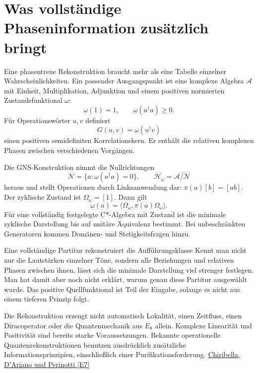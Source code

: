 \section{Was vollständige Phaseninformation zusätzlich bringt}
Eine phasentreue Rekonstruktion braucht mehr als eine Tabelle einzelner Wahrscheinlichkeiten. Ein passender Ausgangspunkt ist eine komplexe Algebra $\mathcal A$ mit Einheit, Multiplikation, Adjunktion und einem positiven normierten Zustandsfunktional $\omega$:
\begin{equation}
\omega(1)=1,\qquad\omega(a^\dagger a)\ge0.
\end{equation}
Für Operationswörter $u,v$ definiert
\begin{equation}
G(u,v)=\omega(u^\dagger v)
\end{equation}
einen positiven semidefiniten Korrelationskern. Er enthält die relativen komplexen Phasen zwischen verschiedenen Vorgängen.

Die GNS-Konstruktion nimmt die Nullrichtungen
\begin{equation}
\mathcal N=\{a:\omega(a^\dagger a)=0\},\qquad
\mathcal H_\omega=\overline{\mathcal A/\mathcal N}
\end{equation}
heraus und stellt Operationen durch Linksanwendung dar: $\pi(a)[b]=[ab]$. Der zyklische Zustand ist $\Omega_\omega=[1]$. Dann gilt
\begin{equation}
\omega(a)=\langle\Omega_\omega,\pi(a)\Omega_\omega\rangle.
\end{equation}
Für eine vollständig festgelegte C*-Algebra mit Zustand ist die minimale zyklische Darstellung bis auf unitäre Äquivalenz bestimmt. Bei unbeschränkten Generatoren kommen Domänen- und Stetigkeitsfragen hinzu.

\begin{bild}{Eine vollständige Partitur rekonstruiert die Aufführungsklasse}
Kennt man nicht nur die Lautstärken einzelner Töne, sondern alle Beziehungen und relativen Phasen zwischen ihnen, lässt sich die minimale Darstellung viel strenger festlegen. Man hat damit aber noch nicht erklärt, warum genau diese Partitur ausgewählt wurde. Das positive Quellfunktional ist Teil der Eingabe, solange es nicht aus einem tieferen Prinzip folgt.
\end{bild}

Die Rekonstruktion erzeugt nicht automatisch Lokalität, einen Zeitfluss, einen Diracoperator oder die Quantenmechanik aus $E_8$ allein. Komplexe Linearität und Positivität sind bereits starke Voraussetzungen. Bekannte operationelle Quantenrekonstruktionen benutzen ausdrücklich zusätzliche Informationsprinzipien, einschließlich einer Purifikationsforderung. \href{https://arxiv.org/abs/1011.6451}{Chiribella, D'Ariano und Perinotti [E7]}

